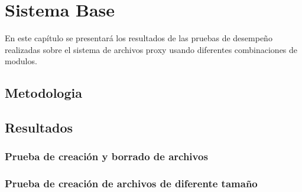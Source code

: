 \chapter{Sistema Base}
\ifpdf
    \graphicspath{{Chapter3/Chapter3Figs/PNG/}{Chapter3/Chapter3Figs/PDF/}{Chapter3/Chapter3Figs/}}
\else
    \graphicspath{{Chapter3/Chapter3Figs/EPS/}{Chapter3/Chapter3Figs/}}
\fi

En este capítulo se presentará los resultados de las pruebas de desempeño realizadas sobre el sistema de archivos proxy usando diferentes combinaciones de modulos.


\section{Metodologia}




\section{Resultados}



\subsection{Prueba de creación y borrado de archivos}



\subsection{Prueba de creación de archivos de diferente tamaño}





